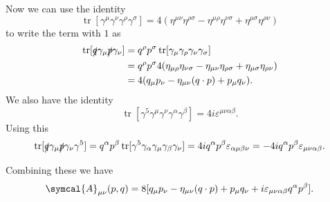 \documentclass[fleqn]{NotesClass}
\newcommand{\amplitude}{\symcal{A}}
\newcommand{\minkowskiMetric}{\eta}
\DeclareMathOperator{\tr}{tr}
\begin{document}
    Now we can use the identity
    \begin{equation}
        \tr[\gamma^\mu\gamma^\nu\gamma^\rho\gamma^\sigma] = 4(\minkowskiMetric^{\mu\nu}\minkowskiMetric^{\rho\sigma} - \minkowskiMetric^{\mu\rho}\minkowskiMetric^{\nu\sigma} + \minkowskiMetric^{\mu\sigma}\minkowskiMetric^{\rho\nu})
    \end{equation}
    to write the term with \(1\) as 
    \begin{align}
        \tr[\slashed{q}\gamma_\mu\slashed{p}\gamma_\nu] &= q^\rho p^\sigma\tr[\gamma_\mu\gamma_\rho\gamma_\nu\gamma_\sigma]\\
        &= q^\rho p^\sigma 4(\minkowskiMetric_{\mu\rho}\minkowskiMetric_{\nu\sigma} - \minkowskiMetric_{\mu\nu}\minkowskiMetric_{\rho\sigma} + \minkowskiMetric_{\mu\sigma}\minkowskiMetric_{\rho\nu})\\
        &= 4(q_\mu p_\nu - \minkowskiMetric_{\mu\nu}(q \cdot p) + p_\mu q_\nu).
    \end{align}
    We also have the identity
    \begin{equation}
        \tr[\gamma^5\gamma^\mu\gamma^\nu\gamma^\alpha\gamma^\beta] = 4i\varepsilon^{\mu\nu\alpha\beta}.
    \end{equation}
    Using this
    \begin{equation}
        \tr[\slashed{q}\gamma_\mu\slashed{p}\gamma_\nu\gamma^5] = q^\alpha p^\beta \tr[\gamma^5\gamma_\alpha\gamma_\mu\gamma_\beta\gamma_\nu] = 4i q^\alpha p^\beta \varepsilon_{\alpha\mu\beta\nu} = -4iq^\alpha p^\beta \varepsilon_{\mu\nu\alpha\beta}.
    \end{equation}
    
    Combining these we have
    \begin{equation}
        \amplitude_{\mu\nu}(p, q) = 8[q_\mu p_\nu - \minkowskiMetric_{\mu\nu}(q \cdot p) + p_\mu q_\nu + i\varepsilon_{\mu\nu\alpha\beta}q^\alpha p^\beta].
    \end{equation}
\end{document}
